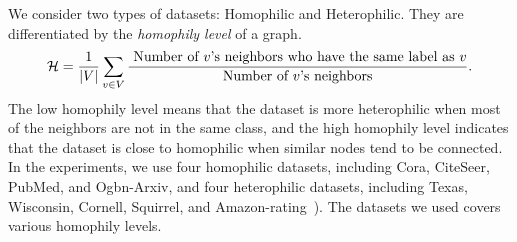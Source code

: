 \begin{table}[h]
\caption{Summary of datasets. $H(G)$ refers to the edge homophily level: the higher, the more homophilic the dataset is.}
\centering
{}
\label{tab: main_data}
\end{table}
We consider two types of datasets: Homophilic and Heterophilic. 
They are differentiated by the \emph{homophily level} of a graph.
$$
\mathcal{H}
=
\frac{1}{|V|} \sum_{v \in V} \frac{\hbox{ Number of } v\hbox{'s neighbors who have the same label as } v}{\hbox{ Number of } v\hbox{'s neighbors }}.
$$
The low homophily level means that the dataset is more heterophilic when most of the neighbors are not in the same class, and the high homophily level indicates that the dataset is close to homophilic when similar nodes tend to be connected. 
In the experiments, we use four homophilic datasets, including Cora, CiteSeer, PubMed, and Ogbn-Arxiv, and four heterophilic datasets, including Texas, Wisconsin, Cornell, Squirrel, and
Amazon-rating~\citep{platonov2023critical}).
The datasets we used covers various homophily levels.

